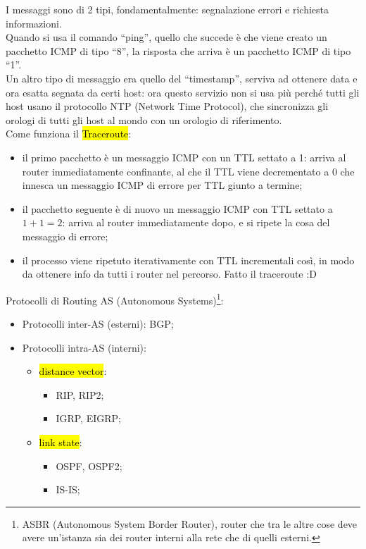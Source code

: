 \noindent I messaggi sono di 2 tipi, fondamentalmente: segnalazione errori e richiesta informazioni.\\

\noindent Quando si usa il comando ``ping'', quello che succede è che viene creato un pacchetto ICMP di tipo ``8'', la risposta che arriva è un pacchetto ICMP di tipo ``1''.\\

\noindent Un altro tipo di messaggio era quello del ``timestamp'', serviva ad ottenere data e ora esatta segnata da certi host: ora questo servizio non si usa più perché tutti gli host usano il protocollo NTP (Network Time Protocol), che sincronizza gli orologi di tutti gli host al mondo con un orologio di riferimento.\\

\noindent Come funziona il \hl{Traceroute}:
\begin{itemize}
    \item il primo pacchetto è un messaggio ICMP con un TTL settato a 1: arriva al router immediatamente confinante, al che il TTL viene decrementato a 0 che innesca un messaggio ICMP di errore per TTL giunto a termine;
    \item il pacchetto seguente è di nuovo un messaggio ICMP con TTL settato a $1+1=2$: arriva al router immediatamente dopo, e si ripete la cosa del messaggio di errore;
    \item il processo viene ripetuto iterativamente con TTL incrementali così, in modo da ottenere info da tutti i router nel percorso. Fatto il traceroute :D
\end{itemize}

\noindent Protocolli di Routing AS (Autonomous Systems)\footnote{ASBR (Autonomous System Border Router), router che tra le altre cose deve avere un'istanza sia dei router interni alla rete che di quelli esterni.}:
\begin{itemize}
    \item Protocolli inter-AS (esterni): BGP;
    \item Protocolli intra-AS (interni):
    \begin{itemize}
        \item \hl{distance vector}:
        \begin{itemize}
            \item RIP, RIP2;
            \item IGRP, EIGRP;
        \end{itemize}
        \item \hl{link state}:
        \begin{itemize}
            \item OSPF, OSPF2;
            \item IS-IS;
        \end{itemize}
    \end{itemize}
\end{itemize}


